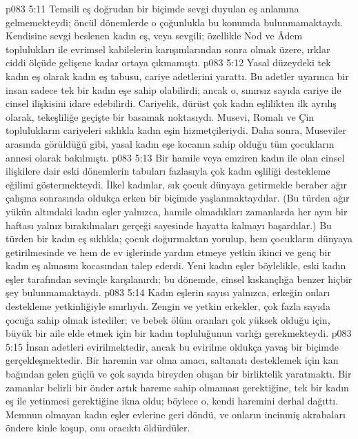 \vs p083 5:11 Temsili eş doğrudan bir biçimde sevgi duyulan eş anlamına gelmemekteydi; öncül dönemlerde o çoğunlukla bu konumda bulunmamaktaydı. Kendisine sevgi beslenen kadın eş, veya sevgili; özellikle Nod ve Âdem toplulukları ile evrimsel kabilelerin karışımlarından sonra olmak üzere, ırklar ciddi ölçüde gelişene kadar ortaya çıkmamıştı.
\vs p083 5:12 Yasal düzeydeki tek kadın eş olarak kadın eş tabusu, cariye adetlerini yarattı. Bu adetler uyarınca bir insan sadece tek bir kadın eşe sahip olabilirdi; ancak o, sınırsız sayıda cariye ile cinsel ilişkisini idare edebilirdi. Cariyelik, dürüst çok kadın eşlilikten ilk ayrılış olarak, tekeşliliğe geçişte bir basamak noktasıydı. Musevi, Romalı ve Çin toplulukların cariyeleri sıklıkla kadın eşin hizmetçileriydi. Daha sonra, Museviler arasında görüldüğü gibi, yasal kadın eşe kocanın sahip olduğu tüm çocukların annesi olarak bakılmıştı.
\vs p083 5:13 Bir hamile veya emziren kadın ile olan cinsel ilişkilere dair eski dönemlerin tabuları fazlasıyla çok kadın eşliliği destekleme eğilimi göstermekteydi. İlkel kadınlar, sık çocuk dünyaya getirmekle beraber ağır çalışma sonrasında oldukça erken bir biçimde yaşlanmaktaydılar. (Bu türden ağır yükün altındaki kadın eşler yalnızca, hamile olmadıkları zamanlarda her ayın bir haftası yalnız bırakılmaları gerçeği sayesinde hayatta kalmayı başardılar.) Bu türden bir kadın eş sıklıkla; çocuk doğurmaktan yorulup, hem çocukların dünyaya getirilmesinde ve hem de ev işlerinde yardım etmeye yetkin ikinci ve genç bir kadın eş almasını kocasından talep ederdi. Yeni kadın eşler böylelikle, eski kadın eşler tarafından sevinçle karşılanırdı; bu dönemde, cinsel kıskançlığa benzer hiçbir şey bulunmamaktaydı.
\vs p083 5:14 Kadın eşlerin sayısı yalnızca, erkeğin onları destekleme yetkinliğiyle sınırlıydı. Zengin ve yetkin erkekler, çok fazla sayıda çocuğa sahip olmak istediler; ve bebek ölüm oranları çok yüksek olduğu için, büyük bir aile elde etmek için bir kadın topluluğunun varlığı gerekmekteydi.
\vs p083 5:15 İnsan adetleri evirilmektedir, ancak bu evirilme oldukça yavaş bir biçimde gerçekleşmektedir. Bir haremin var olma amacı, saltanatı desteklemek için kan bağından gelen güçlü ve çok sayıda bireyden oluşan bir birliktelik yaratmaktı. Bir zamanlar belirli bir önder artık hareme sahip olmaması gerektiğine, tek bir kadın eş ile yetinmesi gerektiğine ikna oldu; böylece o, kendi haremini derhal dağıttı. Memnun olmayan kadın eşler evlerine geri döndü, ve onların incinmiş akrabaları öndere kinle koşup, onu oracıktı öldürdüler.
